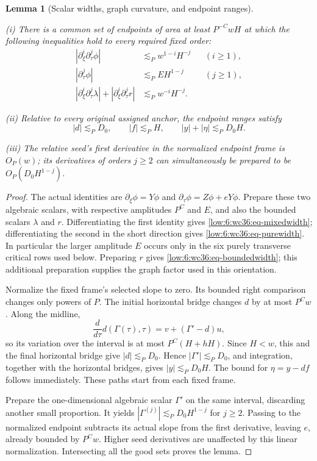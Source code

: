 \documentclass[11pt]{amsart}
\newtheorem{lemma}[theorem]{Lemma}
\theoremstyle{definition}
\theoremstyle{remark}
\numberwithin{equation}{section}
\begin{document}
\begin{lemma}[Scalar widths, graph curvature, and endpoint ranges]\label{low:6:wc36:lem-preparation}

\noindent\textup{(i)} There is a common set of endpoints of area at least $P^{-C}wH$ at which the following inequalities hold to every required fixed order:
\begin{align}
 |\partial_\xi^i\partial_\tau^j\phi|&\lesssim_P w^{1-i}H^{-j} &&(i\ge1),\label{low:6:wc36:eq-mixedwidth}\\
 |\partial_\tau^j\phi|&\lesssim_P E H^{1-j} &&(j\ge1),\label{low:6:wc36:eq-purewidth}\\
 |\partial_\xi^i\partial_\tau^j\lambda|+|\partial_\xi^i\partial_\tau^j r|&\lesssim_P w^{-i}H^{-j}.\label{low:6:wc36:eq-boundedwidth}
\end{align}

\noindent\textup{(ii)} Relative to every original assigned anchor, the endpoint ranges satisfy
\begin{equation}\label{low:6:wc36:eq-endpoint}
 |d|\lesssim_P D_0,\qquad |f|\lesssim_P H,\qquad |y|+|\eta|\lesssim_P D_0H.
\end{equation}

\noindent\textup{(iii)} The relative seed's first derivative in the normalized endpoint frame is $O_P(w)$; its derivatives of orders $j\ge2$ can simultaneously be prepared to be $O_P(D_0H^{1-j})$.
\end{lemma}
\begin{proof}
The actual identities are $\partial_\xi\phi=Y\phi$ and $\partial_\tau\phi=Z\phi+eY\phi$. Prepare these two algebraic scalars, with respective amplitudes $P^C$ and $E$, and also the bounded scalars $\lambda$ and $r$. Differentiating the first identity gives \eqref{low:6:wc36:eq-mixedwidth}; differentiating the second in the short direction gives \eqref{low:6:wc36:eq-purewidth}. In particular the larger amplitude $E$ occurs only in the six purely transverse critical rows used below. Preparing $r$ gives \eqref{low:6:wc36:eq-boundedwidth}; this additional preparation supplies the graph factor used in this orientation.

Normalize the fixed frame's selected slope to zero. Its bounded right comparison changes only powers of $P$. The initial horizontal bridge changes $d$ by at most $P^Cw$. Along the midline,
\[
 \frac{d}{d\tau}d(\Gamma(\tau),\tau)=v+(\Gamma'-d)u,
\]
so its variation over the interval is at most $P^C(H+hH)$. Since $H<w$, this and the final horizontal bridge give $|d|\lesssim_P D_0$. Hence $|\Gamma'|\lesssim_P D_0$, and integration, together with the horizontal bridges, gives $|y|\lesssim_P D_0H$. The bound for $\eta=y-df$ follows immediately. These paths start from each fixed frame.

Prepare the one-dimensional algebraic scalar $\Gamma'$ on the same interval, discarding another small proportion. It yields $|\Gamma^{(j)}|\lesssim_P D_0H^{1-j}$ for $j\ge2$. Passing to the normalized endpoint subtracts its actual slope from the first derivative, leaving $e$, already bounded by $P^Cw$. Higher seed derivatives are unaffected by this linear normalization. Intersecting all the good sets proves the lemma.
\end{proof}
\end{document}

